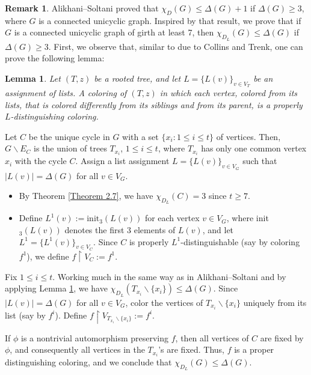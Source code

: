 \documentclass[12pt,reqno,a4paper]{amsart}
\theoremstyle{definition}
\newtheorem{lem}[defn]{Lemma}
\newtheorem{remark}[defn]{Remark}
\begin{document}
\begin{remark}\label{Remark 3.2}
Alikhani--Soltani \cite[Theorem 3.2]{AS2016} proved that $\chi_{D}(G)\leq \Delta(G)+1$ if $\Delta(G)\geq 3$, where $G$ is a connected unicyclic graph. Inspired by that result, we prove that if $G$ is a connected unicyclic graph of girth at least 7, then $\chi_{D_{L}}(G)\leq \Delta(G)$ if $\Delta(G)\geq 3$. First, we observe that, similar to \cite[Lemma 3.2]{CT2006} due to Collins and Trenk, one can prove the following lemma:
\begin{lem}\label{lemma 3.3}
{\em Let $(T,z)$ be a rooted tree, and let $L=\{L(v)\}_{v\in V_{T}}$ be an assignment of lists. A coloring of $(T,z)$ in which each vertex, colored from its lists, that is colored differently from its siblings and from its parent, is a properly $L$-distinguishing coloring.}
\end{lem}
Let $C$ be the unique cycle in $G$ with a set $\{x_{i}:1\leq i\leq t\}$ of vertices. Then, $G \backslash E_{C}$ is the union of trees $T_{x_{i}}$, $1 \leq i \leq t$, where $T_{x_{i}}$ has only one common vertex $x_{i}$ with the cycle $C$. 
Assign a list assignment $L=\{L(v)\}_{v\in V_{G}}$ such that $\vert L(v)\vert= \Delta(G)$ for all $v\in V_{G}$.  
\begin{itemize}
    \item By Theorem \ref{Theorem 2.7}, we have $\chi_{D_{L}}(C)= 3$ since $t\geq 7$.
    \item Define $L^{1}(v):=\mathrm{init}_{3}(L(v))$ for each vertex $v\in V_{G}$, where init$_{3}(L(v))$ denotes the first $3$ elements of $L(v)$, and let $L^{1}=\{L^{1}(v)\}_{v\in V_{C}}$. Since $C$ is properly $L^{1}$-distinguishable (say by coloring $f^1$), we define $f\restriction V_{C}:=f^{1}$.
\end{itemize} 

Fix $1 \leq i \leq t$. 
Working much in the same way as in Alikhani–Soltani \cite[Theorem 3.2]{AS2016} and by applying Lemma \ref{lemma 3.3}, we have $\chi_{D_{L}}(T_{x_{i}}\backslash \{x_{i}\})\leq \Delta(G)$. 
Since $\vert L(v)\vert= \Delta(G)$ for all $v\in V_{G}$, color the vertices of $T_{x_{i}}\backslash\{x_{i}\}$ uniquely from its list (say by $f^i$). 
Define $f\restriction V_{T_{x_{i}}\backslash\{x_{i}\}}:=f^{i}$.

If $\phi$ is a nontrivial automorphism preserving $f$, then all vertices of $C$ are fixed by $\phi$, and consequently all vertices in the $T_{x_{i}}$'s are fixed. Thus, $f$ is a proper distinguishing coloring, and we conclude that $\chi_{D_{L}}(G) \leq \Delta(G)$.
\end{remark}
\end{document}
